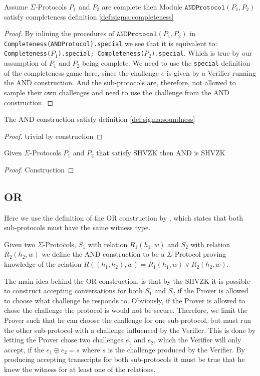 \begin{lemma}
  Assume $\Sigma$-Protocols $P_{1}$ and $P_{2}$ are complete then
  Module $\texttt{ANDProtocol}(P_1, P_2)$ satisfy completeness definition \ref{def:sigma:completeness}
\end{lemma}
\begin{proof}
  By inlining the procedures of $\texttt{ANDProtocol}(P_{1}, P_{2})$ in
  \texttt{Completeness(ANDProtocol).special} we see that it is equivalent to:
  \texttt{Completeness($P_{1}$).special; Completeness($P_{2}$).special}. Which is true by our
  assumption of $P_{1}$ and $P_{2}$ being complete.
  We need to use the \texttt{special} definition of the completeness game here,
  since the challenge $e$ is given by a Verifier running the AND construction.
  And the sub-protocols are, therefore, not allowed to sample their own
  challenges and need to use the challenge from the AND construction.
\end{proof}


\begin{lemma}
  The AND construction satisfy definition \ref{def:sigma:soundness}
\end{lemma}
\begin{proof}
  trivial by construction
\end{proof}

\begin{lemma}
  Given $\Sigma$-Protocols $P_{1}$ and $P_{2}$ that satisfy SHVZK then AND is SHVZK
\end{lemma}
\begin{proof}
  Construction
\end{proof}

\subsection{OR}
\label{subsec:sigma_OR}
Here we use the definition of the OR construction by \cite{on-sigma-protocols},
which states that both sub-protocols must have the same witness type.

Given two $\Sigma$-Protocols, $S_{1}$ with relation $R_{1}(h_{1},w)$ and
$S_{2}$ with relation $R_{2}(h_{2},w)$ we define the AND construction to be a
$\Sigma$-Protocol proving knowledge of the relation
$R((h_{1}, h_{2}), w) = R_{1}(h_{1}, w) \lor R_{2}(h_{2}, w)$.

The main idea behind the OR construction, is that by the SHVZK it is possible to
construct accepting conversations for both $S_{1}$ and $S_{2}$ if the Prover is
allowed to choose what challenge he responds to. Obviously, if the Prover is
allowed to chose the challenge the protocol is would not be secure. Therefore,
we limit the Prover such that he can choose the challenge for one sub-protocol,
but must run the other sub-protocol with a challenge influenced by the Verifier.
This is done by letting the Prover chose two challenges $e_{1}$ and $e_{2}$,
which the Verifier will only accept, if the $e_{1} \oplus e_{2} = s$ where $s$
is the challenge produced by the Verifier.
By producing accepting transcripts for both sub-protocols it must be true that
he knew the witness for at least one of the relations.

